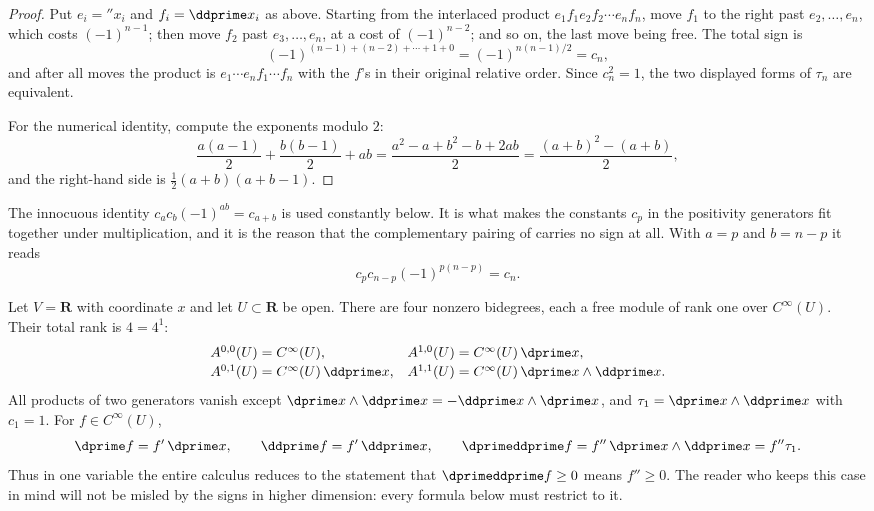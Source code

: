 \begin{proof}
Put $e_i=\dprime x_i$ and $f_i=\ddprime x_i$ as above.  Starting from the
interlaced product $e_1f_1e_2f_2\cdots e_nf_n$, move $f_1$ to the right past
$e_2,\ldots,e_n$, which costs $(-1)^{n-1}$; then move $f_2$ past
$e_3,\ldots,e_n$, at a cost of $(-1)^{n-2}$; and so on, the last move being
free.  The total sign is
\[
 (-1)^{(n-1)+(n-2)+\cdots+1+0}=(-1)^{n(n-1)/2}=c_n,
\]
and after all moves the product is $e_1\cdots e_nf_1\cdots f_n$ with the
$f$'s in their original relative order.  Since $c_n^2=1$, the two displayed
forms of $\tau_n$ are equivalent.

For the numerical identity, compute the exponents modulo $2$:
\[
 \frac{a(a-1)}2+\frac{b(b-1)}2+ab
 =\frac{a^2-a+b^2-b+2ab}2
 =\frac{(a+b)^2-(a+b)}2 ,
\]
and the right-hand side is $\tfrac12(a+b)(a+b-1)$.
\end{proof}

The innocuous identity $c_ac_b(-1)^{ab}=c_{a+b}$ is used constantly below.
It is what makes the constants $c_p$ in the positivity generators fit
together under multiplication, and it is the reason that the complementary
pairing of  carries no sign at all.  With
$a=p$ and $b=n-p$ it reads
\[
 c_pc_{n-p}(-1)^{p(n-p)}=c_n .
\]

\begin{example}
\label{ex:ch09-line}
Let $V=\mathbf R$ with coordinate $x$ and let $U\subset\mathbf R$ be open.
There are four nonzero bidegrees, each a free module of rank one over
$C^\infty(U)$.  Their total rank is $4=4^1$:
\[
 \begin{array}{llll}
 A^{0,0}(U)=C^\infty(U), &
 A^{1,0}(U)=C^\infty(U)\,\dprime x, \\[2pt]
 A^{0,1}(U)=C^\infty(U)\,\ddprime x, &
 A^{1,1}(U)=C^\infty(U)\,\dprime x\wedge\ddprime x .
 \end{array}
\]
All products of two generators vanish except
$\dprime x\wedge\ddprime x=-\ddprime x\wedge\dprime x$, and
$\tau_1=\dprime x\wedge\ddprime x$ with $c_1=1$.  For $f\in C^\infty(U)$,
\[
 \dprime f=f'\,\dprime x,\qquad
 \ddprime f=f'\,\ddprime x,\qquad
 \dprimeddprime f=f''\,\dprime x\wedge\ddprime x=f''\tau_1 .
\]
Thus in one variable the entire calculus reduces to the statement that
$\dprimeddprime f\geq0$ means $f''\geq0$.  The reader who keeps this case in
mind will not be misled by the signs in higher dimension: every formula below
must restrict to it.
\end{example}

